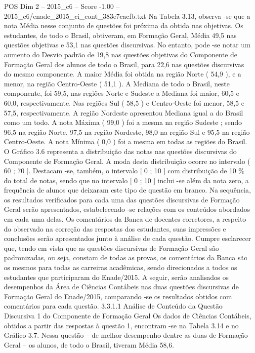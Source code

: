 \begin{textsample}{POS Dim 2 – 2015\_c6 – Score -1.00 – 2015\_c6/enade\_2015\_ci\_cont\_383e7cacfb.txt}
Na Tabela 3.13, observa -se que a nota Média nesse conjunto de questões foi próxima da obtida nas objetivas.
Os estudantes, de todo o Brasil, obtiveram, em Formação Geral, Média 49,5 nas questões objetivas e 53,1 nas questões discursivas.
No entanto, pode -se notar um aumento do Desvio padrão de 19,8 nas questões objetivas do Componente de Formação Geral dos alunos de todo o Brasil, para 22,6 nas questões discursivas do mesmo componente.
A maior Média foi obtida na região Norte ( 54,9 ), e a menor, na região Centro-Oeste ( 51,1 ).
A Mediana de todo o Brasil, neste componente, foi 59,5, nas regiões Norte e Sudeste a Mediana foi maior, 60,5 e 60,0, respectivamente.
Nas regiões Sul ( 58,5 ) e Centro-Oeste foi menor, 58,5 e 57,5, respectivamente.
A região Nordeste apresentou Mediana igual a do Brasil como um todo.
A nota Máxima ( 99,0 ) foi a mesma na região Sudeste ; sendo 96,5 na região Norte, 97,5 na região Nordeste, 98,0 na região Sul e 95,5 na região Centro-Oeste.
A nota Mínima ( 0,0 ) foi a mesma em todas as regiões do Brasil.
O Gráfico 3.6 representa a distribuição das notas nas questões discursivas do Componente de Formação Geral.
A moda desta distribuição ocorre no intervalo ( 60 ; 70 ].
Destacam -se, também, o intervalo [ 0 ; 10 ] com distribuição de 10 \% do total de notas, sendo que no intervalo [ 0 ; 10 ] inclui -se além da nota zero, a frequência de alunos que deixaram este tipo de questão em branco.
Na sequência, os resultados verificados para cada uma das questões discursivas de Formação Geral serão apresentados, estabelecendo -se relações com os conteúdos abordados em cada uma delas.
Os comentários da Banca de docentes corretores, a respeito do observado na correção das respostas dos estudantes, suas impressões e conclusões serão apresentados junto à análise de cada questão.
Cumpre esclarecer que, tendo em vista que as questões discursivas de Formação Geral são padronizadas, ou seja, constam de todas as provas, os comentários da Banca são os mesmos para todas as carreiras acadêmicas, sendo direcionados a todos os estudantes que participaram do Enade/2015.
A seguir, serão analisados os desempenhos da Área de Ciências Contábeis nas duas questões discursivas de Formação Geral do Enade/2015, comparando -se os resultados obtidos com comentários para cada questão. 3.3.1.1 Análise de Conteúdo da Questão Discursiva 1 do Componente de Formação Geral Os dados de Ciências Contábeis, obtidos a partir das respostas à questão 1, encontram -se na Tabela 3.14 e no Gráfico 3.7.
Nessa questão – de melhor desempenho dentre as duas de Formação Geral – os alunos, de todo o Brasil, tiveram Média 58,6.

\end{textsample}

